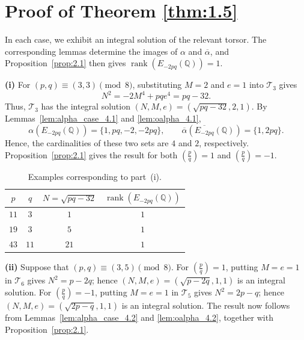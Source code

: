 \documentclass[12pt]{amsart}
\newcommand{\bbQ}{\mathbb{Q}}
\newcommand{\cT}{\mathcal{T}}
\newcommand{\legendre}[2]{\genfrac{(}{)}{}{}{#1}{#2}}
\numberwithin{equation}{section}
\theoremstyle{definition}
\begin{document}



\section{Proof of Theorem \ref{thm:1.5}}
In each case, we exhibit an integral solution of the relevant torsor.
The corresponding lemmas determine the images of $\alpha$ and
$\overline{\alpha}$, and Proposition~\ref{prop:2.1} then gives
$\operatorname{rank}(E_{-2pq}(\bbQ))=1$.

\smallskip
\noindent\textbf{(i)}
For $(p,q)\equiv(3,3)\pmod 8$, substituting $M=2$ and $e=1$ into
$\cT_3$ gives
\[
N^2=-2M^4+pqe^4=pq-32.
\]
Thus, $\cT_3$ has the integral solution
$(N,M,e)=(\sqrt{pq-32},2,1)$. By
Lemmas~\ref{lem:alpha_case_4.1} and \ref{lem:oalpha_4.1},
\[
\alpha(E_{-2pq}(\bbQ))=\{1,pq,-2,-2pq\},
\qquad
\overline{\alpha}(\overline{E_{-2pq}}(\bbQ))
=\{1,2pq\}.
\]
Hence, the cardinalities of these two sets are $4$ and $2$,
respectively. Proposition~\ref{prop:2.1} gives the result for both
$\legendre{p}{q}=1$ and $\legendre{p}{q}=-1$.

\begin{table}[!ht]
\centering
\scriptsize
\renewcommand{\arraystretch}{0.9}
\setlength{\tabcolsep}{5pt}
\begin{tabular}{cccc}
\hline
$p$ & $q$ & $N=\sqrt{pq-32}$ &
$\operatorname{rank}(E_{-2pq}(\bbQ))$\\
\hline
$11$ & $3$  & $1$  & $1$\\
$19$ & $3$  & $5$  & $1$\\
$43$ & $11$ & $21$ & $1$\\
\hline
\end{tabular}
\caption{Examples corresponding to part~\textup{(i)}.}
\label{tab:4}
\end{table}

\smallskip
\noindent\textbf{(ii)}
Suppose that $(p,q)\equiv(3,5)\pmod 8$.
For $\legendre{p}{q}=1$, putting $M=e=1$ in $\cT_6$ gives
$N^2=p-2q$; hence
$(N,M,e)=(\sqrt{p-2q},1,1)$ is an integral solution.
For $\legendre{p}{q}=-1$, putting $M=e=1$ in $\cT_5$ gives
$N^2=2p-q$; hence
$(N,M,e)=(\sqrt{2p-q},1,1)$ is an integral solution.
The result now follows from
Lemmas~\ref{lem:alpha_case_4.2} and \ref{lem:oalpha_4.2},
together with Proposition~\ref{prop:2.1}.
\end{document}
